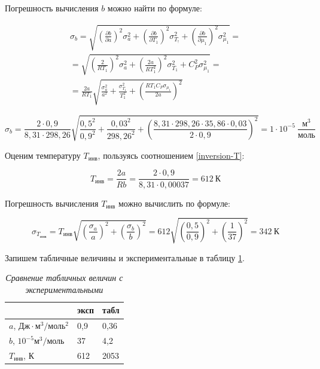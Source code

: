 \documentclass[a4paper,12pt]{article}
\begin{document}
Погрешность вычисления $b$ можно найти по формуле:

\begin{multline*}
    \sigma_b = \sqrt{
    \left ( \frac{\partial b}{\partial a} \right )^2 \sigma_{a} ^ 2 +
    \left ( \frac{\partial b}{\partial T_1} \right )^2 \sigma_{T_!} ^ 2 +
    \left ( \frac{\partial b}{\partial \mu_1} \right )^2 \sigma_{\mu_1} ^ 2
    } = \\
    = \sqrt{
    \left( \frac{2}{R T_1} \right)^2 \sigma_{a} ^ 2 + 
    \left( \frac{2 a}{R T_1^2} \right)^2 \sigma_{T_1} ^ 2 + C_P^2 \sigma_{\mu_1} ^ 2
    } = \\
    = \frac{2 a}{R T_1} \sqrt{
    \frac{\sigma_a^2}{a^2} + \frac{\sigma_{T_1}^2}{T_1^2} + \left( \frac{R T_1 C_P \sigma_{\mu_1}}{2 a} \right)^2
    }
\end{multline*}

\begin{equation}
    \sigma_b = \frac{2 \cdot 0,9}{8,31 \cdot 298,26} \sqrt{
    \frac{0,5^2}{0,9^2} + \frac{0,03^2}{298,26^2} + \left( \frac{8,31 \cdot 298,26 \cdot 35,86 \cdot 0,03}{2 \cdot 0,9} \right)^2
    } = 1 \cdot 10^{-5} \ \frac{\text{м}^3}{\text{моль}}
\end{equation}

Оценим температуру $T_\text{инв}$, пользуясь соотношением \eqref{inversion-T}:

\begin{equation}
    T_\text{инв} = \frac{2 a}{R b} = \frac{2 \cdot 0,9}{8,31 \cdot 0,00037} = 612 \ \text{К}
\end{equation}

Погрешность вычисления $T_\text{инв}$ можно вычислить по формуле:

\begin{equation}
    \sigma_{T_\text{инв}} = T_\text{инв} \sqrt{
    \left( \frac{\sigma_a}{a} \right)^2 + \left( \frac{\sigma_b}{b} \right)^2
    } = 612 \sqrt{
    \left( \frac{0,5}{0,9} \right)^2 + \left( \frac{1}{37} \right)^2
    } = 342 \ \text{К}
\end{equation}

Запишем табличные величины и экспериментальные в таблицу \ref{comp}.

\begin{table}[!ht]
    \centering
    \begin{tabular}{|l|l|l|}
    \hline
        ~ & эксп & табл \\ \hline
        $a$, $\text{Дж} \cdot \text{м}^3 / \text{моль}^2$ & 0,9 & 0,36 \\ \hline
        $b$, $10^{-5} \text{м}^3/\text{моль}$ & 37 & 4,2 \\ \hline
        $T_\text{инв}$, К & 612 & 2053 \\ \hline
    \end{tabular}\caption{\textit{Сравнение табличных величин с экспериментальными}}\label{comp}
\end{table}
\end{document}
